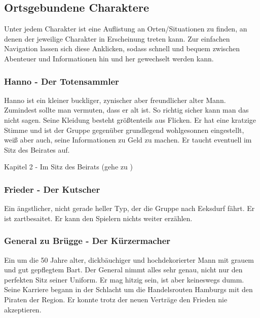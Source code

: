 
\subsection{Ortsgebundene Charaktere}

Unter jedem Charakter ist eine Auflistung an Orten/Situationen zu finden, an denen der jeweilige Charakter in Erscheinung treten kann. Zur einfachen Navigation lassen sich diese Anklicken, sodass schnell und bequem zwischen Abenteuer und Informationen hin und her gewechselt werden kann.

\subsubsection*{Hanno - Der Totensammler}
\label{Hanno}

Hanno ist ein kleiner buckliger, zynischer aber freundlicher alter Mann. Zumindest sollte man vermuten, dass er alt ist. So richtig sicher kann man das nicht sagen. Seine Kleidung besteht größtenteils aus Flicken. Er hat eine kratzige Stimme und ist der Gruppe gegenüber grundlegend wohlgesonnen eingestellt, weiß aber auch, seine Informationen zu Geld zu machen. Er taucht eventuell im Sitz des Beirates auf.

Kapitel 2 - Im Sitz des Beirats (gehe zu \blue{\ref{tot}})

\subsubsection*{Frieder - Der Kutscher}
\label{Frieder}

Ein ängstlicher, nicht gerade heller Typ, der die Gruppe nach Eeksdurf fährt. Er ist zartbesaitet. Er kann den Spielern nichts weiter erzählen.

\subsubsection*{General zu Brügge - Der Kürzermacher}
\label{Brügge}

Ein um die 50 Jahre alter, dickbäuchiger und hochdekorierter Mann mit grauem und gut gepflegtem Bart. Der General nimmt alles sehr genau, nicht nur den perfekten Sitz seiner Uniform. Er mag hitzig sein, ist aber keineswegs dumm. Seine Karriere begann in der Schlacht um die Handelsrouten Hamburgs mit den Piraten der Region. Er konnte trotz der neuen Verträge den Frieden nie akzeptieren.


